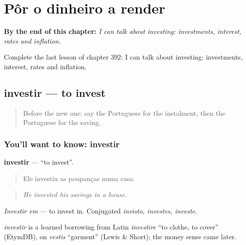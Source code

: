 
\chapter{Pôr o dinheiro a render}
\label{ch:pt-por-o-dinheiro-a-render}

\begin{chapteropening}
\textbf{By the end of this chapter:} \emph{I can talk about investing: investments, interest, rates and inflation.}

Complete the last lesson of chapter 392: I can talk about investing: investments, interest, rates and inflation.
\end{chapteropening}

\section[investir]{investir — to invest}

\label{lesson:PT-C392-investir}



\begin{quote}
Before the new one: say the Portuguese for the instalment, then the Portuguese for the saving.
\end{quote}

\subsection*{You'll want to know: investir}
\textbf{investir} — \textquotedblleft{}to invest\textquotedblright{}.

\begin{quote}
Ele investiu as poupanças numa casa.
\end{quote}

\begin{quote}
\emph{He invested his savings in a house.}
\end{quote}

\emph{Investir em} — to invest in. Conjugated \emph{invisto, investes, investe}.

\begin{cousinweb}
\emph{investir} is a learned borrowing from Latin \emph{investīre} \textquotedblleft{}to clothe, to cover\textquotedblright{} (EtymDB), on \emph{vestis} \textquotedblleft{}garment\textquotedblright{} (Lewis \& Short); the money sense came later.
\end{cousinweb}

